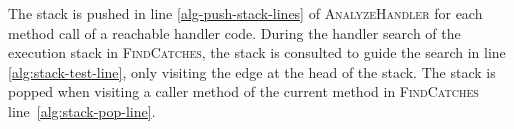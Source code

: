 The stack is pushed in line \ref{alg-push-stack-lines} of
\textsc{AnalyzeHandler} for each method call of a reachable handler
code.  During the handler search of the execution stack in
\textsc{FindCatches}, the stack is consulted to guide the search in
line \ref{alg:stack-test-line}, only visiting the edge at the head
of the stack. The stack is popped when visiting a caller method of the
current method in \textsc{FindCatches} line~\ref{alg:stack-pop-line}.















